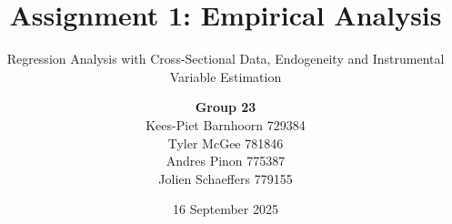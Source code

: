 \usepackage[utf8]{inputenc}
\usepackage[T1]{fontenc}
\usepackage{kpfonts}
\usepackage[scaled=0.9]{sourcecodepro}

\usepackage{url}
\usepackage[style=verbose-ibid, backend=biber]{biblatex}


\usepackage{minted}

\usepackage{graphicx}
\usepackage{float}
\usepackage{tikz}
\usetikzlibrary{positioning}

\usepackage{booktabs}
\usepackage{dcolumn}

\newcommand{\project}{C:/Users/andres/repositories/am.as1/report}
\newcommand{\tables}{\project /stata/output/tables/}
\newcommand{\figures}{\project /stata/output/figures/}

\newcommand{\question}[2]{\section*{\underbar{Question #1 [#2]}}\vspace{-1em}
    \setcounter{table}{0}\renewcommand{\thetable}{#1.\arabic{table}}
    \setcounter{figure}{0}\renewcommand{\thefigure}{#1.\arabic{figure}}
    \setcounter{equation}{0}\renewcommand{\theequation}{#1.\arabic{equation}}}
\newcommand{\note}[1]{\textit{#1}}
\newcommand{\subquestion}[2]{\textit{#1) #2}}
\newcommand{\icode}[1]{\texttt{#1}}


\usepackage{scrlayer-scrpage}
\clearpairofpagestyles
{}
\cfoot{\pagemark}

\subject{FEM 11087 - Applied Microeconometrics}
\title{\Large{Assignment 1: Empirical Analysis}}
\subtitle{Regression Analysis with Cross-Sectional Data, Endogeneity and Instrumental Variable Estimation}
\author{\textbf{Group 23}\\[0.5em]
    Kees-Piet Barnhoorn 729384\\
    Tyler McGee 781846\\
    Andres Pinon 775387\\
    Jolien Schaeffers 779155}
\date{16 September 2025}

